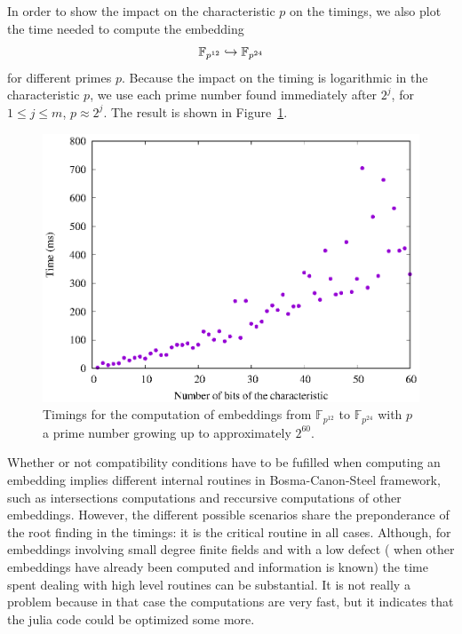 In order to show the impact on the characteristic $p$ on the timings, we also
plot the time needed to compute the embedding
\[
  \mathbb{F}_{p^{12}}\hookrightarrow\mathbb{F}_{p^{24}}
\]
for different primes $p$. Because the impact on the timing is logarithmic in the
characteristic $p$, we use each prime number found immediately after $2^j$,
for $1\leq j\leq m$, \ie $p\approx 2^j$. The result is shown in
Figure~\ref{fig:bcs-embed-primes}.
\begin{figure}
  \centering
  \includegraphics{benchmarks/lattice-bcs/embed-primes-exp.eps}
  \caption{Timings for the computation of embeddings from $\mathbb{F}_{p^{12}}$
  to $\mathbb{F}_{p^{24}}$ with $p$ a prime number growing up to approximately
  $2^{60}$.}
  \label{fig:bcs-embed-primes}
\end{figure}
Whether or not compatibility conditions have to be fufilled when computing an
embedding implies different internal routines in Bosma-Canon-Steel framework,
such as intersections computations and reccursive computations of other
embeddings. However, the different possible scenarios share the preponderance of the
root finding in the timings: it is the critical routine in all cases. Although,
for embeddings involving small degree finite fields and with a low defect (\ie
when other embeddings have already been computed and information is known) the
time spent dealing with high level routines can be substantial. It is not
really a problem because in that case the computations are very fast, but it
indicates that the julia code could be optimized some more.

%
